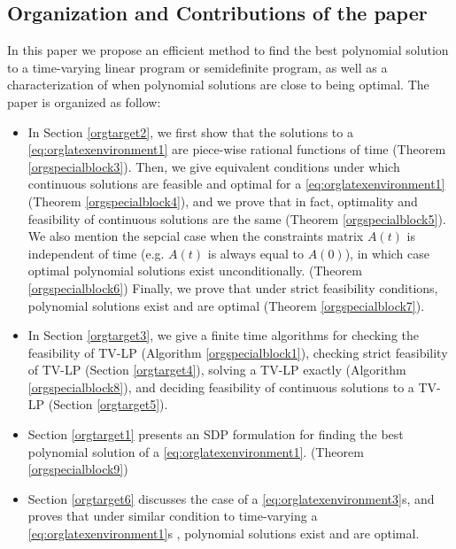 \documentclass[moor]{informs1}
\begin{document}
\subsection{Organization and Contributions of the paper}
\label{sec:orgheadline3}
In this paper we propose an efficient method to find the best polynomial solution to a time-varying linear program or semidefinite program, as well as a characterization of when polynomial solutions are close to being optimal. The paper is organized as follow:
\begin{itemize}
\item In Section \ref{orgtarget2}, we first show that the solutions to a \ref{eq:orglatexenvironment1} are piece-wise rational functions of time (Theorem \ref{orgspecialblock3}). Then, we give equivalent conditions under which continuous solutions are feasible and optimal for a \ref{eq:orglatexenvironment1} (Theorem \ref{orgspecialblock4}), and we prove that in fact, optimality and feasibility of continuous solutions are the same (Theorem \ref{orgspecialblock5}). We also mention the sepcial case when the constraints matrix \(A(t)\) is independent of time (e.g.  \(A(t)\) is always equal to \(A(0)\)), in which case optimal polynomial solutions exist unconditionally. (Theorem \ref{orgspecialblock6}) Finally, we prove that under strict feasibility conditions, polynomial solutions exist and are optimal (Theorem \ref{orgspecialblock7}).

\item In Section \ref{orgtarget3}, we give a finite time algorithms for checking the feasibility of TV-LP (Algorithm \ref{orgspecialblock1}), checking strict feasibility of TV-LP (Section \ref{orgtarget4}), solving a TV-LP exactly (Algorithm \ref{orgspecialblock8}), and deciding feasibility of continuous solutions to a TV-LP (Section \ref{orgtarget5}).
\end{itemize}



\begin{itemize}
\item Section \ref{orgtarget1} presents an SDP formulation for finding the best polynomial solution of a \ref{eq:orglatexenvironment1}. (Theorem \ref{orgspecialblock9})
\item Section \ref{orgtarget6} discusses the case of a \ref{eq:orglatexenvironment3}s, and proves that under similar condition to time-varying a \ref{eq:orglatexenvironment1}s , polynomial solutions exist and are optimal.
\end{itemize}
\newpage
\end{document}
